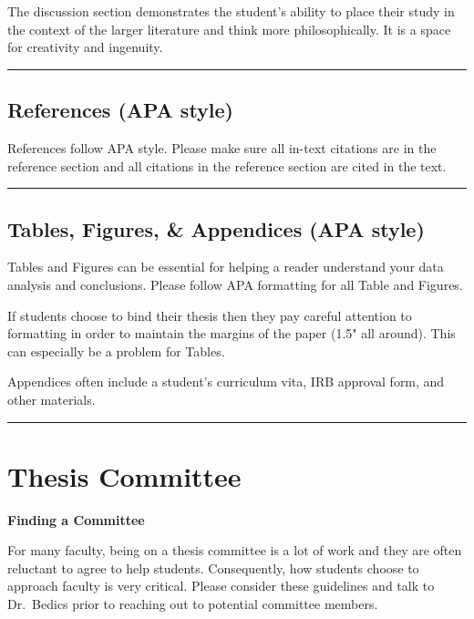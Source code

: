 \documentclass[openany]{book}
\begin{document}
The discussion section demonstrates the student's ability to place their study in the context of the larger literature and think more philosophically. It is a space for creativity and ingenuity.

\begin{center}\rule{0.5\linewidth}{0.5pt}\end{center}

\hypertarget{references-apa-style}{%
\section{References (APA style)}\label{references-apa-style}}

References follow APA style. Please make sure all in-text citations are in the reference section and all citations in the reference section are cited in the text.

\begin{center}\rule{0.5\linewidth}{0.5pt}\end{center}

\hypertarget{tables-figures-appendices-apa-style}{%
\section{Tables, Figures, \& Appendices (APA style)}\label{tables-figures-appendices-apa-style}}

Tables and Figures can be essential for helping a reader understand your data analysis and conclusions. Please follow APA formatting for all Table and Figures.

If students choose to bind their thesis then they pay careful attention to formatting in order to maintain the margins of the paper (1.5" all around). This can especially be a problem for Tables.

Appendices often include a student's curriculum vita, IRB approval form, and other materials.

\begin{center}\rule{0.5\linewidth}{0.5pt}\end{center}

\hypertarget{people}{%
\chapter{Thesis Committee}\label{people}}

\textbf{Finding a Committee}

For many faculty, being on a thesis committee is a lot of work and they are often reluctant to agree to help students. Consequently, how students choose to approach faculty is very critical. Please consider these guidelines and talk to Dr.~Bedics prior to reaching out to potential committee members.
\end{document}
